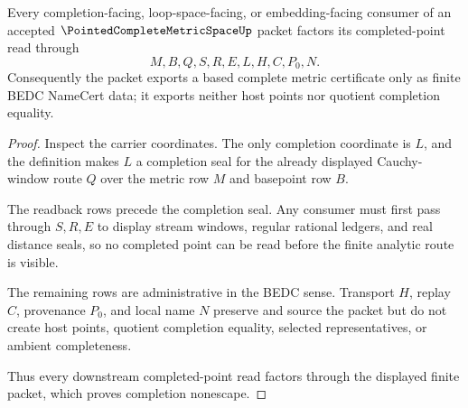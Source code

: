 \begin{theorem}
\label{thm:pointed-complete-metric-space-completion-nonescape}
Every completion-facing, loop-space-facing, or embedding-facing consumer of an
accepted $\PointedCompleteMetricSpaceUp$ packet factors its completed-point
read through
$$
M,B,Q,S,R,E,L,H,C,P_0,N .
$$
Consequently the packet exports a based complete metric certificate only as
finite BEDC NameCert data; it exports neither host points nor quotient
completion equality.
\end{theorem}
\begin{proof}
Inspect the carrier coordinates. The only completion coordinate is $L$, and
the definition makes $L$ a completion seal for the already displayed
Cauchy-window route $Q$ over the metric row $M$ and basepoint row $B$.

The readback rows precede the completion seal. Any consumer must first pass
through $S,R,E$ to display stream windows, regular rational ledgers, and real
distance seals, so no completed point can be read before the finite analytic
route is visible.

The remaining rows are administrative in the BEDC sense. Transport $H$, replay
$C$, provenance $P_0$, and local name $N$ preserve and source the packet but
do not create host points, quotient completion equality, selected
representatives, or ambient completeness.

Thus every downstream completed-point read factors through the displayed
finite packet, which proves completion nonescape.
\end{proof}


\begin{closurestatus}{\PointedCompleteMetricSpaceUp}
  \theoryclosure{\seedClosure}
  \formalstatus{\unformalizedV}
\end{closurestatus}
